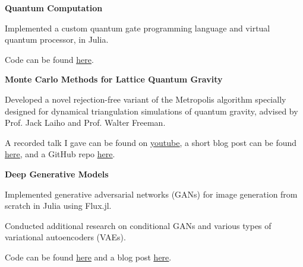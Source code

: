 \documentclass[9pt]{extarticle}
\begin{document}
\vspace{2.5pt}
\large\textbf{Quantum Computation}
\normalsize

\begin{compactitem}
\item Implemented a custom quantum gate programming language and virtual quantum processor, in Julia. 

\item Code can be found \href{https://github.com/aarontrowbridge/QuIPS}{\underline{here}}.

\end{compactitem}

\vspace{2.5pt}
\large\textbf{Monte Carlo Methods for Lattice Quantum Gravity}
\normalsize

\begin{compactitem}
\item Developed a novel rejection-free variant of the Metropolis algorithm specially designed for dynamical triangulation simulations of quantum gravity, advised by Prof. Jack Laiho and Prof. Walter Freeman.
\item A recorded talk I gave can be found on \href{https://www.youtube.com/watch?v=_Ppx0e3aG-E&t=2s}{\underline{youtube}}, a short blog post can be found \href{https://aarontrowbridge.github.io/posts/the-freeman-method/}{\underline{here}}, and a GitHub repo \href{https://github.com/aarontrowbridge/Ising}{\underline{here}}.
\end{compactitem}



\vspace{2.5pt}
\large\textbf{Deep Generative Models}
\normalsize

\begin{compactitem}
\item Implemented generative adversarial networks (GANs) for image generation from scratch in Julia using Flux.jl. 
\item Conducted additional research on conditional GANs and various types of variational autoencoders (VAEs).
\item Code can be found \href{https://github.com/aarontrowbridge/FluxGAN.jl}{\underline{here}} and a blog post \href{https://aarontrowbridge.github.io/posts/generative-adversarial-nets/}{\underline{here}}.
\end{compactitem}
\end{document}
